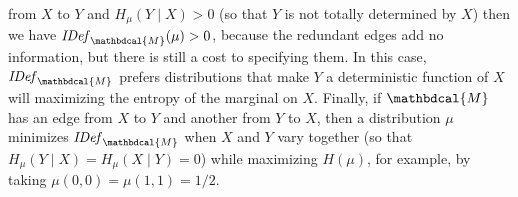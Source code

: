 \documentclass{article}
\theoremstyle{plain}
\theoremstyle{definition}
\theoremstyle{remark}
\newcommand{\dg}[1]{\mathbdcal{#1}}
\newcommand{\IDef}[1]{\mathit{IDef}_{#1}}
\numberwithin{equation}{section}
\begin{document}
 from $X$ to $Y$
 and $H_{\mu}(Y \mid X) > 0$ 
(so that $Y$ is not totally determined by $X$)
then we have $\IDef{\dg M}(\mu) > 0$, because the redundant edges add no
information, but there is still a cost to specifying them.
In this case, $\IDef{\dg M}$ prefers distributions that make $Y$ a
deterministic function of $X$ will maximizing the entropy of the
marginal on $X$.
Finally, if ${\dg M}$ has an edge from $X$ to $Y$ and another from $Y$
to $X$, then 
a distribution $\mu$ minimizes
$\IDef{\dg M}$ when 
$X$ and $Y$  vary together
(so that $H_\mu(Y \mid X) = H_\mu(X \mid Y) = 0$) while
maximizing $H(\mu)$, for example, by taking $\mu(0,0) = \mu(1,1) = 1/2$.
\end{document}
